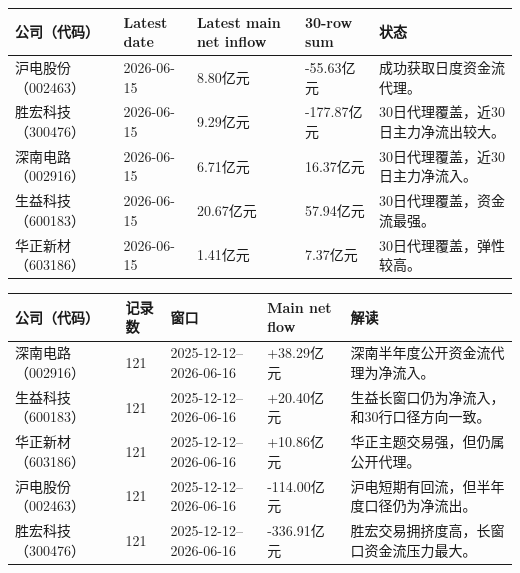 \begin{exhibitbox}
\small
\begin{tabularx}{\textwidth}{L{2.0cm}R{2.0cm}R{2.4cm}R{2.0cm}X}
\toprule
\textbf{公司（代码）} & \textbf{Latest date} & \textbf{Latest main net inflow} & \textbf{30-row sum} & \textbf{状态} \\
\midrule
沪电股份（002463） & 2026-06-15 & 8.80亿元 & -55.63亿元 & 成功获取日度资金流代理。 \\
胜宏科技（300476） & 2026-06-15 & 9.29亿元 & -177.87亿元 & 30日代理覆盖，近30日主力净流出较大。 \\
深南电路（002916） & 2026-06-15 & 6.71亿元 & 16.37亿元 & 30日代理覆盖，近30日主力净流入。 \\
生益科技（600183） & 2026-06-15 & 20.67亿元 & 57.94亿元 & 30日代理覆盖，资金流最强。 \\
华正新材（603186） & 2026-06-15 & 1.41亿元 & 7.37亿元 & 30日代理覆盖，弹性较高。 \\
\bottomrule
\end{tabularx}
\end{exhibitbox}

\begin{exhibitbox}
\footnotesize
\begin{tabularx}{\textwidth}{L{1.8cm}R{1.6cm}R{2.0cm}R{2.2cm}X}
\toprule
\textbf{公司（代码）} & \textbf{记录数} & \textbf{窗口} & \textbf{Main net flow} & \textbf{解读} \\
\midrule
深南电路（002916） & 121 & 2025-12-12--2026-06-16 & +38.29亿元 & 深南半年度公开资金流代理为净流入。 \\
生益科技（600183） & 121 & 2025-12-12--2026-06-16 & +20.40亿元 & 生益长窗口仍为净流入，和30行口径方向一致。 \\
华正新材（603186） & 121 & 2025-12-12--2026-06-16 & +10.86亿元 & 华正主题交易强，但仍属公开代理。 \\
沪电股份（002463） & 121 & 2025-12-12--2026-06-16 & -114.00亿元 & 沪电短期有回流，但半年度口径仍为净流出。 \\
胜宏科技（300476） & 121 & 2025-12-12--2026-06-16 & -336.91亿元 & 胜宏交易拥挤度高，长窗口资金流压力最大。 \\
\bottomrule
\end{tabularx}
\end{exhibitbox}

